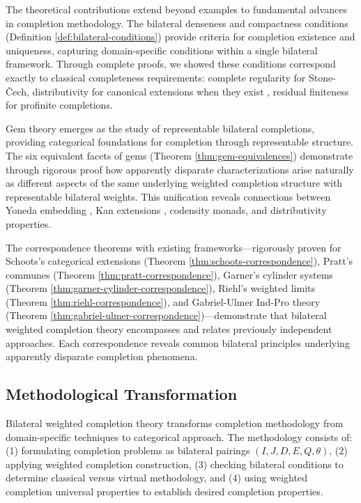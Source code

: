 \documentclass[11pt]{article}
\theoremstyle{plain}
\theoremstyle{definition}
\theoremstyle{remark}
\begin{document}
The theoretical contributions extend beyond examples to fundamental advances in completion methodology. The bilateral denseness and compactness conditions (Definition \ref{def:bilateral-conditions}) provide criteria for completion existence and uniqueness, capturing domain-specific conditions within a single bilateral framework. Through complete proofs, we showed these conditions correspond exactly to classical completeness requirements: complete regularity for Stone-\v{C}ech, distributivity for canonical extensions when they exist \cite{gehrke2001bounded}, residual finiteness for profinite completions.

Gem theory emerges as the study of representable bilateral completions, providing categorical foundations for completion through representable structure. The six equivalent facets of gems (Theorem \ref{thm:gem-equivalences}) demonstrate through rigorous proof how apparently disparate characterizations arise naturally as different aspects of the same underlying weighted completion structure with representable bilateral weights. This unification reveals connections between Yoneda embedding \cite{yoneda1954homology}, Kan extensions \cite{kan1958adjoint}, codensity monads, and distributivity properties.

The correspondence theorems with existing frameworks---rigorously proven for Schoots's categorical extensions \cite{schoots2015generalising} (Theorem \ref{thm:schoots-correspondence}), Pratt's communes \cite{pratt2010communes} (Theorem \ref{thm:pratt-correspondence}), Garner's cylinder systems \cite{garner2018isbell} (Theorem \ref{thm:garner-cylinder-correspondence}), Riehl's weighted limits \cite{riehl2008weighted} (Theorem \ref{thm:riehl-correspondence}), and Gabriel-Ulmer Ind-Pro theory \cite{gabriel1971lokal} (Theorem \ref{thm:gabriel-ulmer-correspondence})---demonstrate that bilateral weighted completion theory encompasses and relates previously independent approaches. Each correspondence reveals common bilateral principles underlying apparently disparate completion phenomena.

\subsection{Methodological Transformation}

Bilateral weighted completion theory transforms completion methodology from domain-specific techniques to categorical approach. The methodology consists of: (1) formulating completion problems as bilateral pairings $(I, J, D, E, Q, \theta)$, (2) applying weighted completion construction, (3) checking bilateral conditions to determine classical versus virtual methodology, and (4) using weighted completion universal properties to establish desired completion properties.
\end{document}

